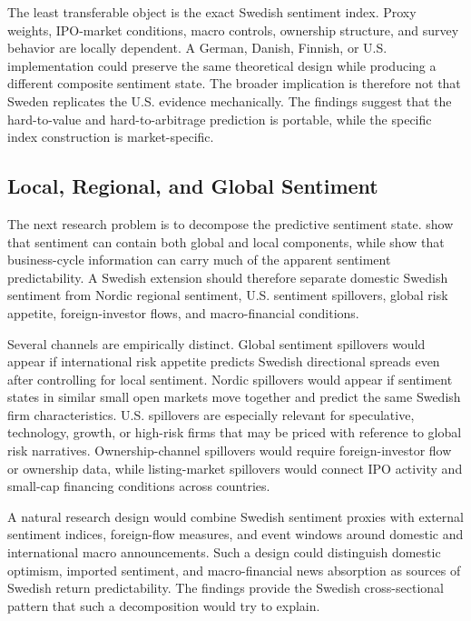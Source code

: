 \documentclass[11pt]{article}
\begin{document}
The least transferable object is the exact Swedish sentiment index. Proxy weights, IPO-market conditions, macro controls, ownership structure, and survey behavior are locally dependent. A German, Danish, Finnish, or U.S. implementation could preserve the same theoretical design while producing a different composite sentiment state. The broader implication is therefore not that Sweden replicates the U.S. evidence mechanically. The findings suggest that the hard-to-value and hard-to-arbitrage prediction is portable, while the specific index construction is market-specific.

\subsection{Local, Regional, and Global Sentiment}
The next research problem is to decompose the predictive sentiment state. \citet{baker2012global} show that sentiment can contain both global and local components, while \citet{sibley2012sentimental} show that business-cycle information can carry much of the apparent sentiment predictability. A Swedish extension should therefore separate domestic Swedish sentiment from Nordic regional sentiment, U.S. sentiment spillovers, global risk appetite, foreign-investor flows, and macro-financial conditions.

Several channels are empirically distinct. Global sentiment spillovers would appear if international risk appetite predicts Swedish directional spreads even after controlling for local sentiment. Nordic spillovers would appear if sentiment states in similar small open markets move together and predict the same Swedish firm characteristics. U.S. spillovers are especially relevant for speculative, technology, growth, or high-risk firms that may be priced with reference to global risk narratives. Ownership-channel spillovers would require foreign-investor flow or ownership data, while listing-market spillovers would connect IPO activity and small-cap financing conditions across countries.

A natural research design would combine Swedish sentiment proxies with external sentiment indices, foreign-flow measures, and event windows around domestic and international macro announcements. Such a design could distinguish domestic optimism, imported sentiment, and macro-financial news absorption as sources of Swedish return predictability. The findings provide the Swedish cross-sectional pattern that such a decomposition would try to explain.
\end{document}
